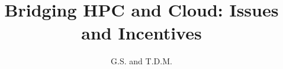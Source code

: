 \documentclass[sigconf,review]{acmart}
\begin{document}
\title{Bridging HPC and Cloud: Issues and Incentives}

%


\author{G.S. and T.D.M.}


%
\end{document}
